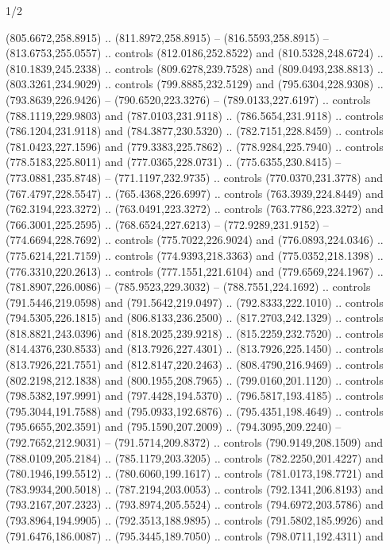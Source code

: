 \begin{flagdescription}{1/2}
\begin{scope}[shift={(2*\flaglength/3-0.25*\rb,0.51333\flagwidth)},scale=0.001715\flagwidth*\stretchfactor]
\begin{scope}[y=-1pt, x=1pt,cm={{1.04354,0.0,0.0,1.01818,(-827,-297)}}]
\begin{scope}[draw=black,line width=0.015\flagwidth]
\begin{scope}[fill=gold]
  (805.6672,258.8915) .. (811.8972,258.8915) -- (816.5593,258.8915) --
  (813.6753,255.0557) .. controls (812.0186,252.8522) and (810.5328,248.6724) ..
  (810.1839,245.2338) .. controls (809.6278,239.7528) and (809.0493,238.8813) ..
  (803.3261,234.9029) .. controls (799.8885,232.5129) and (795.6304,228.9308) ..
  (793.8639,226.9426) -- (790.6520,223.3276) -- (789.0133,227.6197) .. controls
  (788.1119,229.9803) and (787.0103,231.9118) .. (786.5654,231.9118) .. controls
  (786.1204,231.9118) and (784.3877,230.5320) .. (782.7151,228.8459) .. controls
  (781.0423,227.1596) and (779.3383,225.7862) .. (778.9284,225.7940) .. controls
  (778.5183,225.8011) and (777.0365,228.0731) .. (775.6355,230.8415) --
  (773.0881,235.8748) -- (771.1197,232.9735) .. controls (770.0370,231.3778) and
  (767.4797,228.5547) .. (765.4368,226.6997) .. controls (763.3939,224.8449) and
  (762.3194,223.3272) .. (763.0491,223.3272) .. controls (763.7786,223.3272) and
  (766.3001,225.2595) .. (768.6524,227.6213) -- (772.9289,231.9152) --
  (774.6694,228.7692) .. controls (775.7022,226.9024) and (776.0893,224.0346) ..
  (775.6214,221.7159) .. controls (774.9393,218.3363) and (775.0352,218.1398) ..
  (776.3310,220.2613) .. controls (777.1551,221.6104) and (779.6569,224.1967) ..
  (781.8907,226.0086) -- (785.9523,229.3032) -- (788.7551,224.1692) .. controls
  (791.5446,219.0598) and (791.5642,219.0497) .. (792.8333,222.1010) .. controls
  (794.5305,226.1815) and (806.8133,236.2500) .. (817.2703,242.1329) .. controls
  (818.8821,243.0396) and (818.2025,239.9218) .. (815.2259,232.7520) .. controls
  (814.4376,230.8533) and (813.7926,227.4301) .. (813.7926,225.1450) .. controls
  (813.7926,221.7551) and (812.8147,220.2463) .. (808.4790,216.9469) .. controls
  (802.2198,212.1838) and (800.1955,208.7965) .. (799.0160,201.1120) .. controls
  (798.5382,197.9991) and (797.4428,194.5370) .. (796.5817,193.4185) .. controls
  (795.3044,191.7588) and (795.0933,192.6876) .. (795.4351,198.4649) .. controls
  (795.6655,202.3591) and (795.1590,207.2009) .. (794.3095,209.2240) --
  (792.7652,212.9031) -- (791.5714,209.8372) .. controls (790.9149,208.1509) and
  (788.0109,205.2184) .. (785.1179,203.3205) .. controls (782.2250,201.4227) and
  (780.1946,199.5512) .. (780.6060,199.1617) .. controls (781.0173,198.7721) and
  (783.9934,200.5018) .. (787.2194,203.0053) .. controls (792.1341,206.8193) and
  (793.2167,207.2323) .. (793.8974,205.5524) .. controls (794.6972,203.5786) and
  (793.8964,194.9905) .. (792.3513,188.9895) .. controls (791.5802,185.9926) and
  (791.6476,186.0087) .. (795.3445,189.7050) .. controls (798.0711,192.4311) and

\end{scope}
\end{scope}
\end{scope}
\end{scope}
\end{flagdescription}
